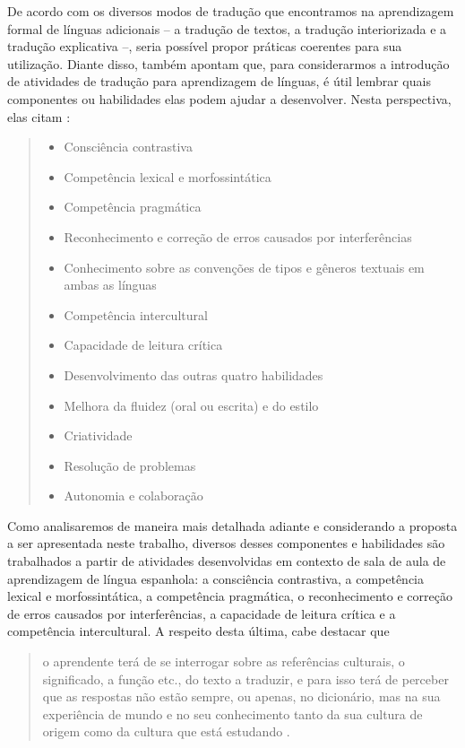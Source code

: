 \documentclass[portuguese]{textolivre}
\begin{document}
De acordo com os diversos modos de tradução que encontramos na aprendizagem formal de línguas adicionais -- a tradução de textos, a tradução interiorizada e a tradução explicativa \cite{HurtadoAlbir1987, ArribaGarcia1996, pintado2019} --, seria possível propor práticas coerentes para sua utilização. Diante disso, \textcite{carreres2019} também apontam que, para considerarmos a introdução de atividades de tradução para aprendizagem de línguas, é útil lembrar quais componentes ou habilidades elas podem ajudar a desenvolver. Nesta perspectiva, elas citam \cite[p. 619, tradução nossa]{carreres2019}:
\begin{quote}
\begin{itemize}
\item Consciência contrastiva
\item Competência lexical e morfossintática
\item Competência pragmática
\item Reconhecimento e correção de erros causados por interferências
\item Conhecimento sobre as convenções de tipos e gêneros textuais em ambas as línguas
\item Competência intercultural
\item Capacidade de leitura crítica
\item Desenvolvimento das outras quatro habilidades
\item Melhora da fluidez (oral ou escrita) e do estilo
\item Criatividade
\item Resolução de problemas
\item Autonomia e colaboração
\end{itemize}
\end{quote}

Como analisaremos de maneira mais detalhada adiante e considerando a proposta a ser apresentada neste trabalho, diversos desses componentes e habilidades são trabalhados a partir de atividades desenvolvidas em contexto de sala de aula de aprendizagem de língua espanhola: a consciência contrastiva, a competência lexical e morfossintática, a competência pragmática, o reconhecimento e correção de erros causados por interferências, a capacidade de leitura crítica e a competência intercultural. A respeito desta última, cabe destacar que

\begin{quote}
o aprendente terá de se interrogar sobre as referências culturais, o significado, a função etc., do texto a traduzir, e para isso terá de perceber que as respostas não estão sempre, ou apenas, no dicionário, mas na sua experiência de mundo e no seu conhecimento tanto da sua cultura de origem como da cultura que está estudando \cite[p. 64, tradução nossa]{mendo2009}.
\end{quote}
\end{document}

